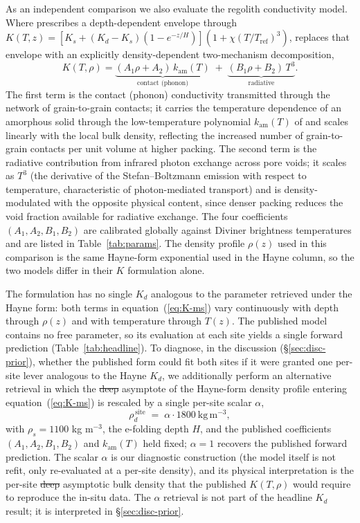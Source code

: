 \documentclass[11pt]{article}
\makeatletter
\let\sout@orig\sout
\renewcommand{\sout}[1]{\ifmmode\text{\sout@orig{\ensuremath{#1}}}\else\sout@orig{#1}\fi}
\newcommand{\new}[1]{\textcolor{green!60!black}{#1}}
\newcommand{\old}[1]{\textcolor{red!70!black}{\sout{#1}}}
\newcommand{\new}[1]{\textcolor{green!60!black}{#1}}
\newcommand{\old}[1]{}
\newcommand{\new}[1]{#1}
\newcommand{\old}[1]{}
\makeatother
\begin{document}
As an independent comparison we also evaluate the \citet{martinez2021}
regolith conductivity model. Where \citet{hayne2017} prescribes a
depth-dependent envelope through
$K(T,z)=[K_s+(K_d-K_s)(1-e^{-z/H})](1+\chi(T/T_\mathrm{ref})^3)$,
\citet{martinez2021} replaces that envelope with an explicitly
density-dependent two-mechanism decomposition,
\begin{equation}
K(T,\rho) = \underbrace{(A_1\rho + A_2)\,k_\mathrm{am}(T)}_{\text{contact (phonon)}}
          \;+\; \underbrace{(B_1\rho + B_2)\,T^3}_{\text{radiative}}.
\label{eq:K-ms}
\end{equation}
The first term is the contact (phonon) conductivity transmitted through the
network of grain-to-grain contacts; it carries the temperature dependence
of an amorphous solid through the low-temperature polynomial
$k_\mathrm{am}(T)$ of \citet{martinez2021} and scales linearly with the
local bulk density, reflecting the increased number of grain-to-grain
contacts per unit volume at higher packing. The second term is the
radiative contribution from infrared photon exchange across pore voids; it
scales as $T^3$ (the derivative of the Stefan--Boltzmann emission with
respect to temperature, characteristic of photon-mediated transport) and is
density-modulated with the opposite physical content, since denser packing
reduces the void fraction available for radiative exchange. The four
coefficients $(A_1,A_2,B_1,B_2)$ are calibrated globally against Diviner
brightness temperatures and are listed in Table~\ref{tab:params}. The
density profile $\rho(z)$ used in this comparison is the same Hayne-form
exponential used in the Hayne column, so the two models differ in their $K$
formulation alone.

The \citet{martinez2021} formulation has no single $K_d$ analogous to the
parameter retrieved under the Hayne form: both terms in
equation~(\ref{eq:K-ms}) vary continuously with depth through $\rho(z)$ and
with temperature through $T(z)$. The published model contains no free
parameter, so its evaluation at each site yields a single forward
prediction (Table~\ref{tab:headline}). To diagnose, in the discussion
(\S\ref{sec:disc-prior}), whether the published \citet{martinez2021} form
could fit both sites if it were granted one per-site lever analogous to the
Hayne $K_d$, we additionally perform an alternative retrieval in which the
\old{deep }asymptote of the Hayne-form density profile entering
equation~(\ref{eq:K-ms}) is rescaled by a single per-site scalar $\alpha$,
\begin{equation}
\rho_d^{\,\text{site}} \;=\; \alpha\cdot 1800\ \mathrm{kg\,m^{-3}},
\label{eq:alpha}
\end{equation}
with $\rho_s=1100$ kg m$^{-3}$, the e-folding depth $H$, and the published
coefficients $(A_1,A_2,B_1,B_2)$ and $k_\mathrm{am}(T)$ held fixed;
$\alpha=1$ recovers the published forward prediction. The scalar $\alpha$
is our diagnostic construction (the \citet{martinez2021} model itself is
not refit, only re-evaluated at a per-site density), and its physical
interpretation is the per-site \old{deep }\new{asymptotic }bulk density that
the published $K(T,\rho)$ would require to reproduce the in-situ data. The
$\alpha$ retrieval is not part of the headline $K_d$ result; it is
interpreted in \S\ref{sec:disc-prior}.
\end{document}
